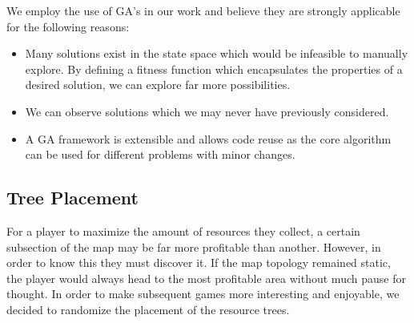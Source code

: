 We employ the use of GA's in our work and believe they are strongly applicable for the following reasons:
\begin{itemize}
\item Many solutions exist in the state space which would be infeasible to manually explore. By defining a fitness function
which encapsulates the properties of a desired solution, we can explore far more possibilities.
\item We can observe solutions which we may never have previously considered.
\item A GA framework is extensible and allows code reuse as the core algorithm can be used for different problems with 
minor changes.
\end{itemize}

\subsection{Tree Placement}
For a player to maximize the amount of resources they collect, a certain subsection of the map
may be far more profitable than another. However, in order to know this they must discover it. If the map topology
remained static, the player would always head to the most profitable area without much pause for thought.
In order to make subsequent games more interesting and enjoyable, we decided to randomize the placement of
the resource trees. 

